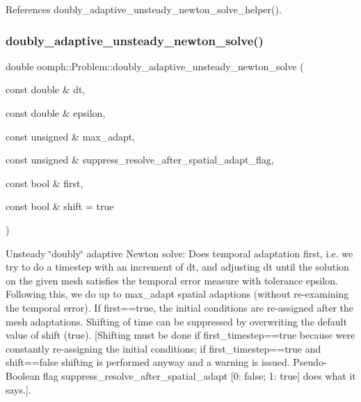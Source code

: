 References doubly\+\_\+adaptive\+\_\+unsteady\+\_\+newton\+\_\+solve\+\_\+helper().

\mbox{\label{classoomph_1_1Problem_ae6c326bce8647c2a59cf62288ce4902e}} 
\subsubsection{\texorpdfstring{doubly\+\_\+adaptive\+\_\+unsteady\+\_\+newton\+\_\+solve()}{doubly\_adaptive\_unsteady\_newton\_solve()}\hspace{0.1cm}{\footnotesize\ttfamily [2/2]}}
{\footnotesize\ttfamily double oomph\+::\+Problem\+::doubly\+\_\+adaptive\+\_\+unsteady\+\_\+newton\+\_\+solve (\begin{DoxyParamCaption}\item[{const double \&}]{dt,  }\item[{const double \&}]{epsilon,  }\item[{const unsigned \&}]{max\+\_\+adapt,  }\item[{const unsigned \&}]{suppress\+\_\+resolve\+\_\+after\+\_\+spatial\+\_\+adapt\+\_\+flag,  }\item[{const bool \&}]{first,  }\item[{const bool \&}]{shift = {\ttfamily true} }\end{DoxyParamCaption})\hspace{0.3cm}{\ttfamily [inline]}}



Unsteady \char`\"{}doubly\char`\"{} adaptive Newton solve\+: Does temporal adaptation first, i.\+e. we try to do a timestep with an increment of dt, and adjusting dt until the solution on the given mesh satisfies the temporal error measure with tolerance epsilon. Following this, we do up to max\+\_\+adapt spatial adaptions (without re-\/examining the temporal error). If first==true, the initial conditions are re-\/assigned after the mesh adaptations. Shifting of time can be suppressed by overwriting the default value of shift (true). \mbox{[}Shifting must be done if first\+\_\+timestep==true because we\textquotesingle{}re constantly re-\/assigning the initial conditions; if first\+\_\+timestep==true and shift==false shifting is performed anyway and a warning is issued. Pseudo-\/\+Boolean flag suppress\+\_\+resolve\+\_\+after\+\_\+spatial\+\_\+adapt \mbox{[}0\+: false; 1\+: true\mbox{]} does what it says.\mbox{]}. 



